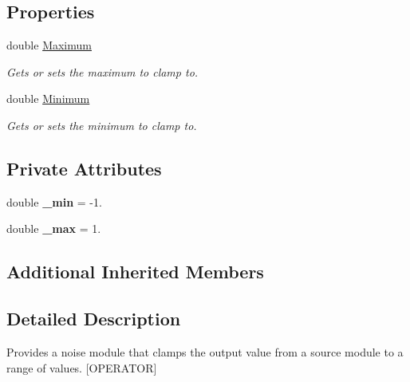 \subsection*{Properties}
\begin{DoxyCompactItemize}
\item 
double \hyperlink{class_lib_noise_1_1_operator_1_1_clamp_acf1dd60983307c4ff6a63f2f4df33333}{Maximum}
\begin{DoxyCompactList}\small\item\em Gets or sets the maximum to clamp to. \end{DoxyCompactList}\item 
double \hyperlink{class_lib_noise_1_1_operator_1_1_clamp_a024bbf117ceaa0021e3c764c03998999}{Minimum}
\begin{DoxyCompactList}\small\item\em Gets or sets the minimum to clamp to. \end{DoxyCompactList}\end{DoxyCompactItemize}
\subsection*{Private Attributes}
\begin{DoxyCompactItemize}
\item 
\mbox{\label{class_lib_noise_1_1_operator_1_1_clamp_af75f70ceb26d34635b69858739768131}} 
double {\bfseries \+\_\+min} = -\/1.
\item 
\mbox{\label{class_lib_noise_1_1_operator_1_1_clamp_a8d2d46313c62976da3a775efcd9fde74}} 
double {\bfseries \+\_\+max} = 1.
\end{DoxyCompactItemize}
\subsection*{Additional Inherited Members}


\subsection{Detailed Description}
Provides a noise module that clamps the output value from a source module to a range of values. \mbox{[}O\+P\+E\+R\+A\+T\+OR\mbox{]} 



